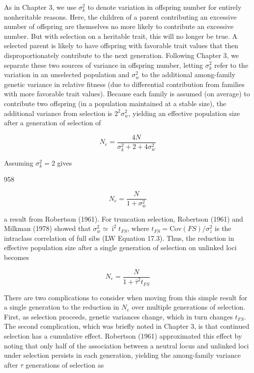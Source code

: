 \documentclass{article}
\begin{document}
As in Chapter 3, we use  $ \sigma_k^2 $ to denote variation in offspring number for entirely nonheritable reasons. Here, the children of a parent contributing an excessive number of offspring are themselves no more likely to contribute an excessive number. But with selection on a heritable trait, this will no longer be true. A selected parent is likely to have offspring with favorable trait values that then disproportionately contribute to the next generation. Following Chapter 3, we separate these two sources of variance in offspring number, letting  $ \sigma_k^2 $ refer to the variation in an unselected population and  $ \sigma_w^2 $ to the additional among-family genetic variance in relative fitness (due to differential contribution from families with more favorable trait values). Because each family is assumed (on average) to contribute two offspring (in a population maintained at a stable size), the additional variance from selection is  $ 2^2 \sigma_w^2 $, yielding an effective population size after a generation of selection of

\begin{equation}
N_{e}=\frac{4N}{\sigma_{k}^{2}+2+4\sigma_{w}^{2}}
\tag{26.5}
\label{eq:26_5}
\end{equation}

Assuming  $ \sigma_{k}^{2}=2 $ gives

958

\begin{equation}
N_{e}=\frac{N}{1+\sigma_{w}^{2}}
\tag{26.6a}
\label{eq:26_6a}
\end{equation}

a result from Robertson (1961). For truncation selection, Robertson (1961) and Milkman (1978) showed that  $ \sigma_w^2 \simeq \bar{\imath}^2 t_{FS} $, where  $ t_{FS} = \text{Cov}(FS)/\sigma_z^2 $ is the intraclass correlation of full sibs (LW Equation 17.3). Thus, the reduction in effective population size after a single generation of selection on unlinked loci becomes

\begin{equation}
N_{e}=\frac{N}{1+\bar{\tau}^{2}t_{FS}}
\tag{26.6b}
\label{eq:26_6b}
\end{equation}

There are two complications to consider when moving from this simple result for a single generation to the reduction in  $ N_e $ over multiple generations of selection. First, as selection proceeds, genetic variances change, which in turn changes  $ t_{FS} $. The second complication, which was briefly noted in Chapter 3, is that continued selection has a cumulative effect. Robertson (1961) approximated this effect by noting that only half of the association between a neutral locus and unlinked loci under selection persists in each generation, yielding the among-family variance after  $ \tau $ generations of selection as
\end{document}
